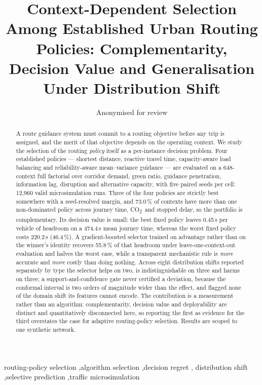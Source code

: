 \documentclass[preprint,12pt]{elsarticle}
\newcommand{\CO}{CO\textsubscript{2}}
\begin{document}
\begin{frontmatter}

\title{Context-Dependent Selection Among Established Urban Routing
Policies: Complementarity, Decision Value and Generalisation Under
Distribution Shift}

\author{Anonymised for review}
\address{Affiliations withheld for review}

\begin{abstract}
A route guidance system must commit to a routing objective before any trip is
assigned, and the merit of that objective depends on the operating context.
We study the selection of the routing \emph{policy} itself as a per-instance
decision problem. Four established policies --- shortest distance, reactive
travel time, capacity-aware load balancing and reliability-aware mean--variance
guidance --- are evaluated on a 648-context full factorial over corridor demand,
green ratio, guidance penetration, information lag, disruption and alternative
capacity, with five paired seeds per cell: 12{,}960 valid microsimulation runs.
Three of the four policies are strictly best somewhere with a seed-resolved
margin, and 73.0\,\% of contexts have more than one non-dominated policy across
journey time, \CO\ and stopped delay, so the portfolio is complementary. Its
decision value is small: the best fixed policy leaves 0.45\,s per vehicle of
headroom on a 474.4\,s mean journey time, whereas the worst fixed policy costs
220.2\,s (46.4\,\%). A gradient-boosted selector trained on advantage rather than
on the winner's identity recovers 55.8\,\% of that headroom under
leave-one-context-out evaluation and halves the worst case, while a transparent
mechanistic rule is \emph{more} accurate and \emph{more} costly than doing
nothing. Across eight distribution shifts reported separately by type the
selector helps on two, is indistinguishable on three and harms on three; a
support-and-confidence gate never certified a deviation, because the conformal
interval is two orders of magnitude wider than the effect, and flagged none of
the domain shift its features cannot encode. The contribution is a measurement
rather than an algorithm: complementarity, decision value and deployability are
distinct and quantitatively disconnected here, so reporting the first as
evidence for the third overstates the case for adaptive routing-policy
selection. Results are scoped to one synthetic network.
\end{abstract}

\begin{keyword}
routing-policy selection \sep algorithm selection \sep decision regret \sep
distribution shift \sep selective prediction \sep traffic microsimulation
\end{keyword}

\end{frontmatter}
\end{document}
